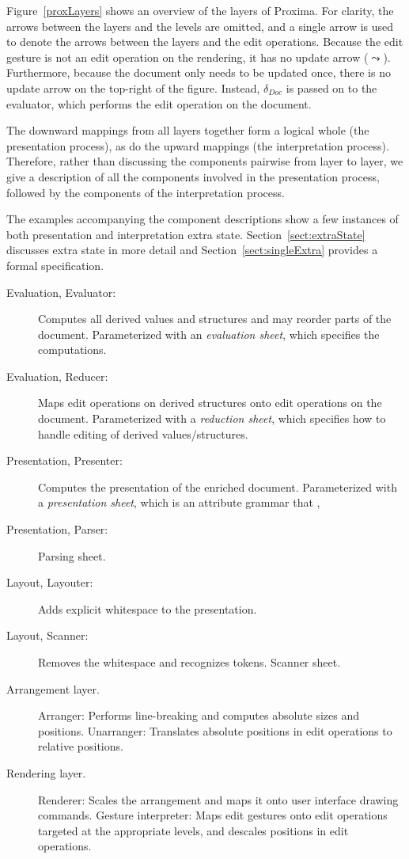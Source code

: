 \documentclass{speauth}
\begin{document}
Figure~\ref{proxLayers} shows an overview of the layers of Proxima. For clarity, the arrows between the layers and the levels are omitted, and a single arrow is used to denote the arrows between the layers and the edit operations. Because the edit gesture is not an edit operation on the rendering, it has no update arrow ($\leadsto$). Furthermore, because the document only needs to be updated once, there is no update arrow on the top-right of the figure. Instead, $\delta_{Doc}$ is passed on to the evaluator, which performs the edit operation on the document.

The downward mappings from all layers together form a logical whole (the presentation process), as do the upward mappings (the interpretation process). Therefore, rather than discussing the components pairwise from layer to layer, we give a description of all the components involved in the presentation process, followed by the components of the interpretation process. 

The examples accompanying the component descriptions show a few instances of both presentation and interpretation extra state. Section~\ref{sect:extraState} discusses extra state in more detail and Section~\ref{sect:singleExtra} provides a formal specification. 

\bc
\begin{description}
\item [Evaluation, Evaluator:] Computes all derived values and structures and may reorder parts of the document. Parameterized with an {\em evaluation sheet}, which specifies the computations.
\item [Evaluation, Reducer:] Maps edit operations on derived structures onto edit operations on the document. Parameterized with a {\em reduction sheet}, which specifies how to handle editing of derived values/structures.
\item [Presentation, Presenter:] Computes the presentation of the enriched document. Parameterized with a {\em presentation sheet}, which is an attribute grammar that , 
\item [Presentation, Parser:] Parsing sheet.
\item [Layout, Layouter:] Adds explicit whitespace to the presentation.
\item [Layout, Scanner:] Removes the whitespace and recognizes tokens. Scanner sheet.
\item [Arrangement layer.]
Arranger: Performs line-breaking and computes absolute sizes and positions.
Unarranger: Translates absolute positions in edit operations to relative positions.
\item [Rendering layer.]
Renderer: Scales the arrangement and maps it onto user interface drawing commands.
Gesture interpreter: Maps edit gestures onto edit operations targeted at the appropriate levels, and descales positions in edit operations.
\end{description}
\ec
\end{document}
